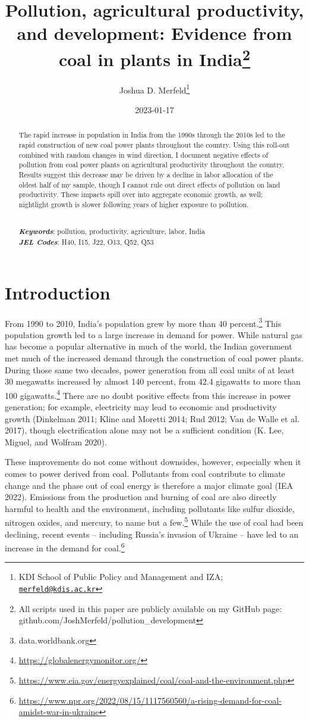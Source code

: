 \documentclass[
]{article}
\title{Pollution, agricultural productivity, and development: Evidence from coal in plants in India\footnote{All scripts used in this paper are publicly available on my GitHub page: github.com/JoshMerfeld/pollution\_development}}
\author{Joshua D. Merfeld\footnote{KDI School of Public Policy and Management and IZA; \href{mailto:merfeld@kdis.ac.kr}{\nolinkurl{merfeld@kdis.ac.kr}}}}
\date{2023-01-17}
\begin{document}
\maketitle
\begin{abstract}
\noindent The rapid increase in population in India from the 1990s through the 2010s led to the rapid construction of new coal power plants throughout the country. Using this roll-out combined with random changes in wind direction, I document negative effects of pollution from coal power plants on agricultural productivity throughout the country. Results suggest this decrease may be driven by a decline in labor allocation of the oldest half of my sample, though I cannot rule out direct effects of pollution on land productivity. These impacts spill over into aggregate economic growth, as well; nightlight growth is slower following years of higher exposure to pollution.\\
\strut \\
\textbf{\textit{Keywords}}: pollution, productivity, agriculture, labor, India\\
\textbf{\textit{JEL Codes}}: H40, I15, J22, O13, Q52, Q53
\end{abstract}

\newpage
\doublespacing

\hypertarget{introduction}{%
\section{Introduction}\label{introduction}}

From 1990 to 2010, India's population grew by more than 40 percent.\footnote{data.worldbank.org} This population growth led to a large increase in demand for power. While natural gas has become a popular alternative in much of the world, the Indian government met much of the increased demand through the construction of coal power plants. During those same two decades, power generation from all coal units of at least 30 megawatts increased by almost 140 percent, from 42.4 gigawatts to more than 100 gigawatts.\footnote{\url{https://globalenergymonitor.org/}} There are no doubt positive effects from this increase in power generation; for example, electricity may lead to economic and productivity growth (Dinkelman 2011; Kline and Moretti 2014; Rud 2012; Van de Walle et al. 2017), though electrification alone may not be a sufficient condition (K. Lee, Miguel, and Wolfram 2020).

These improvements do not come without downsides, however, especially when it comes to power derived from coal. Pollutants from coal contribute to climate change and the phase out of coal energy is therefore a major climate goal (IEA 2022). Emissions from the production and burning of coal are also directly harmful to health and the environment, including pollutants like sulfur dioxide, nitrogen oxides, and mercury, to name but a few.\footnote{\url{https://www.eia.gov/energyexplained/coal/coal-and-the-environment.php}} While the use of coal had been declining, recent events -- including Russia's invasion of Ukraine -- have led to an increase in the demand for coal.\footnote{\url{https://www.npr.org/2022/08/15/1117560560/a-rising-demand-for-coal-amidst-war-in-ukraine}}
\end{document}
